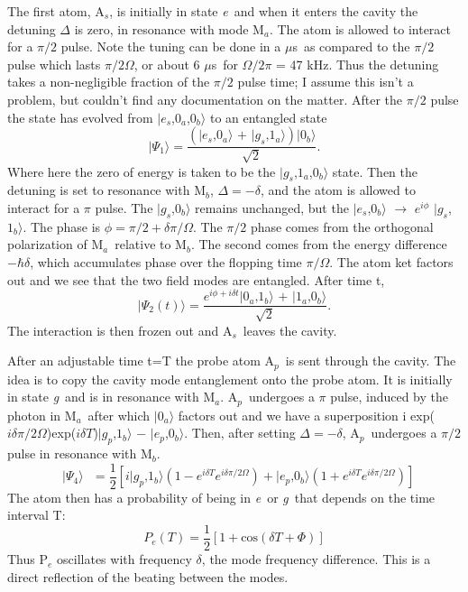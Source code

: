\documentclass[12pt]{article}
\newcommand{\As}{A$_s$}
\newcommand{\Ap}{A$_p$}
\newcommand{\Ma}{M$_a$}
\newcommand{\Mb}{M$_b$}
\newcommand{\micros}{$\mu$s}
\newcommand{\es}{{\it e}}
\newcommand{\gs}{{\it g}}
\newcommand{\kettt}[3]{$|${#1},{#2},{#3}$\rangle$}
\newcommand{\kett}[2]{$|${#1},{#2}$\rangle$}
\newcommand{\ket}[1]{$|${#1}$\rangle$}
\begin{document}
The first atom, \As, is initially in state \es\ and when it enters the cavity
the detuning $\Delta$ is zero, in resonance with mode \Ma. 
The atom
is allowed to interact for a $\pi/2$ pulse.  Note the tuning can be done in a
\micros\ as compared to the $\pi/2$ pulse which lasts $\pi/2\Omega$, or 
about 6 \micros\ for $\Omega/2\pi$ = 47 kHz. Thus the detuning takes a
non-negligible 
fraction of the $\pi/2$ pulse time; I assume this isn't a problem, but couldn't find
any documentation on the matter.
After the $\pi/2$ pulse the state has evolved
from \kettt{$e_s$}{$0_a$}{$0_b$} to an entangled state
\begin{equation}
\textrm{\ket{$\Psi_1$}}  = 
\frac{( \textrm{\kett{$e_s$}{$0_a$} + \kett{$g_s$}{$1_a$}} ) \textrm{\ket{$0_b$}}}{\sqrt{2}}.
\end{equation}
Where here the zero of energy is taken to be the \kettt{$g_s$}{$1_a$}{$0_b$} state.
Then the detuning is set to resonance with \Mb, $\Delta = -\delta$, and the
atom is allowed to interact for a $\pi$ pulse. The \kett{$g_s$}{$0_b$} 
remains unchanged, but
the \kett{$e_s$}{$0_b$} $\rightarrow$ $e^{i \phi}$ \kett{$g_s$}{$1_b$}.
The phase is $\phi = \pi/2 + \delta\pi/\Omega$. The $\pi/2$ phase comes from
the orthogonal polarization of 
\Ma\ relative to \Mb. The second comes from the 
energy difference $-\hbar \delta$, which accumulates phase over the
flopping time $\pi/\Omega$.
The atom ket factors out and we see that the two field modes are 
entangled. After time t, 
\begin{equation}
\textrm{\ket{$\Psi_2(t)$}} = 
\frac{ e^{i \phi + i \delta t} \textrm{\kett{$0_a$}{$1_b$} + 
\kett{$1_a$}{$0_b$}} }{\sqrt{2}}.
\end{equation}
The interaction is then frozen out and \As\ leaves the cavity.

After an adjustable time t=T the probe atom \Ap\ is sent through the cavity. The 
idea is to copy the cavity mode entanglement onto the probe atom. It is
initially in state \gs\ and is in resonance with \Ma.  \Ap\ undergoes a $\pi$
pulse, induced by the photon in \Ma\ after which \ket{$0_a$} factors out and
we have a superposition  i exp($i\delta\pi/2\Omega$)exp($i\delta T$)\kett{$g_p$}{$1_b$} $-$ \kett{$e_p$}{$0_b$}. Then, 
after setting $\Delta = -\delta$, \Ap\ 
undergoes a $\pi/2$ pulse in resonance with \Mb. 
\begin{equation}
\textrm{ \ket{$\Psi_4$} } = \frac{1}{2}[i\textrm{\kett{$g_p$}{$1_b$}}
             (1 - e^{i \delta T}e^{i \delta \pi/2 \Omega})
                        + \textrm{\kett{$e_p$}{$0_b$}} 
             (1 + e^{i \delta T}e^{i \delta \pi/2 \Omega}) ]
\end{equation}
The atom then has a probability
of being in \es\ or \gs\ that depends on the time interval T: 
\begin{equation}
P_e(T) = \frac{1}{2}[ 1 + \textrm{cos} (\delta T + \Phi) ]
\end{equation}
Thus P$_e$ oscillates with frequency $\delta$, the mode frequency difference.
This is a direct reflection of the beating between the modes.
\end{document}
